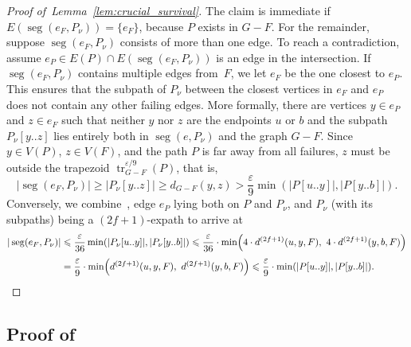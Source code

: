 \documentclass{article}\usepackage[a4paper,margin=20mm]{geometry}
\DeclareMathOperator{\tr}{tr}
\DeclareMathOperator{\seg}{seg}
\newcommand*{\length}[1]{|#1|}
\renewcommand{\le}{\leqslant}
\renewcommand{\ge}{\geqslant}
\newcommand{\eps}{\varepsilon}
\begin{document}
\begin{proof}[Proof of~Lemma~\ref{lem:crucial_survival}]
  The claim is immediate if $E(\seg(e_F,P_{\nu})) = \{e_F\}$, because $P$ exists in $G-F$.
  For the remainder, suppose $\seg(e_F,P_{\nu})$ consists of more than one edge.
  To reach a contradiction, assume $e_P \in E(P) \cap E(\seg(e_F,P_{\nu}))$
  is an edge in the intersection.
  If $\seg(e_F,P_{\nu})$ contains multiple edges from~$F$,
  we let $e_F$ be the one closest to $e_P$.
  This ensures that the subpath of $P_{\nu}$ between the closest vertices in $e_F$ and $e_P$ 
  does not contain any other failing edges.
  More formally, there are vertices $y \in e_P$ and $z \in e_F$
  such that neither $y$ nor $z$ are the endpoints $u$ or $b$ and
  the subpath $P_{\nu}[y..z]$ lies entirely both in $\seg(e,P_{\nu})$ and the graph $G-F$.
  Since $y \in V(P)$, $z \in V(F)$, 
  and the path $P$ is far away from all failures, 
  $z$ must be outside the trapezoid $\tr^{\eps/9}_{G-F}(P)$, that is,
  \begin{equation*}
    \length{\seg(e_F,P_{\nu})} \ge \length{P_{\nu}[y..z]} 
    \ge d_{G-F}(y,z) > \frac{\eps}{9} \min(\length{P[u..y]},\length{P[y..b]}).
  \end{equation*}
  Conversely, we combine~,
  edge $e_P$ lying both on $P$ and $P_{\nu}$,
  and $P_{\nu}$ (with its subpaths) being a $(2f{+}1)$-expath to arrive at
  \begin{align*}
    \length{\seg(e_F,P_{\nu})}
      &\le \frac{\eps}{36} \min(\length{P_{\nu}[u..y]}, \length{P_{\nu}[y..b]})
       \le \frac{\eps}{36} \cdot 
        \min\!\left(4 \cdot d^{(2f+1)}(u,y,F), \ 4 \cdot d^{(2f+1)}(y,b,F)\right)\\[.33em]
      &= \frac{\eps}{9} \cdot 
        \min\!\left(d^{(2f+1)}(u,y,F), \ d^{(2f+1)}(y,b,F)\right)
       \le \frac{\eps}{9} \cdot \min(\length{P[u..y]}, \length{P[y..b]}). \qedhere
  \end{align*}
\end{proof}


\subsection{Proof of \texorpdfstring{}{Lemma 5.1}}
\label{subsec:sublinear_wrapup}
\end{document}
